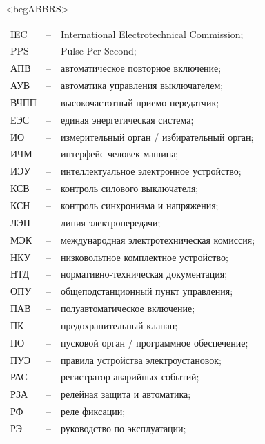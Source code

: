 \color{unidarkgreen}\section*{}
{\color{white}\fontsize{0.1pt}{0.1pt}\selectfont<begABBRS>}
\color{black}
\begin{longtable}{>{\raggedright\arraybackslash}m{2cm}>{\raggedright\arraybackslash}m{0.5cm}>{\raggedright\arraybackslash}m{20cm}}
\endfirsthead\endhead\endfoot\endlastfoot
IEC & -- &  International Electrotechnical Commission; \\
PPS & -- & Pulse Per Second; \\
АПВ & -- & автоматическое повторное включение; \\
АУВ & -- & автоматика управления выключателем; \\
ВЧПП & -- & высокочастотный приемо-передатчик; \\
ЕЭС & -- & единая энергетическая система; \\
ИО & -- & измерительный орган / избирательный орган; \\
ИЧМ & -- & интерфейс человек-машина; \\
ИЭУ & -- & интеллектуальное электронное устройство; \\
КСВ & -- & контроль силового выключателя; \\
КСН & -- & контроль синхронизма и напряжения; \\
ЛЭП & -- & линия электропередачи; \\
МЭК & -- & международная электротехническая комиссия; \\
НКУ & -- & низковольтное комплектное устройство; \\
НТД & -- & нормативно-техническая документация; \\
ОПУ & -- & общеподстанционный пункт управления; \\
ПАВ & -- & полуавтоматическое включение; \\
ПК & -- & предохранительный клапан; \\
ПО & -- & пусковой орган / программное обеспечение; \\
ПУЭ & -- & правила устройства электроустановок; \\
РАС & -- & регистратор аварийных событий; \\
РЗА & -- & релейная защита и автоматика; \\
РФ & -- & реле фиксации; \\
РЭ & -- & руководство по эксплуатации; \\

\end{longtable}
